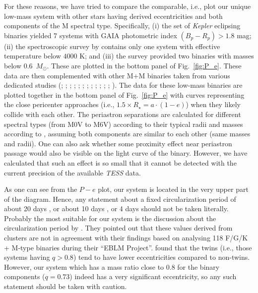 \documentclass[fleqn,usenatbib]{mnras} %
\begin{document}
For these reasons, we have tried to compare the comparable, i.e., plot our unique low-mass system with other stars having derived eccentricities and both components of the M spectral type. Specifically, (i) the set of {\em Kepler} eclipsing binaries yielded 7 systems with GAIA photometric index $(B_p-R_p) > 1.8$ mag; (ii) the spectroscopic survey by \citet{latham02} contains only one system with effective temperature below $4000$ K; and (iii) the survey \citet{halbwachs03} provided two binaries with masses below 0.6~$M_\odot$. These are plotted in the bottom panel of Fig.~\ref{fig:P_e}. These data are then complemented with other M+M binaries taken from various dedicated studies (\citealt{Stassun2006}; \citealt{Morales2009b}; \citealt{Carter2011}; \citealt{Irwin2011}; \citealt{Gomez2012}; \citealt{Kraus2015}; \citealt{David2016}; \citealt{Gillen2017}; \citealt{Kraus2017}; \citealt{Lubin2017}; \citealt{Irwin2018}; \citealt{Murphy2020}; \citealt{Acton2020}). The data for these low-mass binaries are plotted together in the bottom panel of Fig.~\ref{fig:P_e} with curves representing the close pericenter approaches (i.e., $1.5 \times R_\star = a \cdot (1-e)$) when they likely collide with each other. The periastron separations are calculated for different spectral types (from M0V to M6V) according to their typical radii and masses according to \cite{pecaut13}, assuming both components are similar to each other (same masses and radii). One can also ask whether some proximity effect near periastron passage would also be visible on the light curve of the binary. However, we have calculated that such an effect is so small that it cannot be detected with the current precision of the available {\em TESS} data.

As one can see from the $P-e$ plot, our system is located in the very upper part of the diagram. Hence, any statement about a fixed circularization period of about 20 days \citep{latham02}, or about 10 days \citep{meibom05}, or 4 days \citep{halbwachs03} should not be taken literally. Probably the most suitable for our system is the discussion about the circularization period by  \citet{triaud17}.  They pointed out that these values derived from clusters are not in agreement with their findings based on analysing 118 F/G/K + M-type binaries during their ``EBLM Project''. \citet{halbwachs03} found that the twins (i.e., those systems having $q > 0.8$) tend to have lower eccentricities compared to non-twins. However, our system which has a mass ratio close to 0.8 for the binary components ($q = 0.73$) indeed has a very significant eccentricity, so any such statement should be taken with caution.
\end{document}
